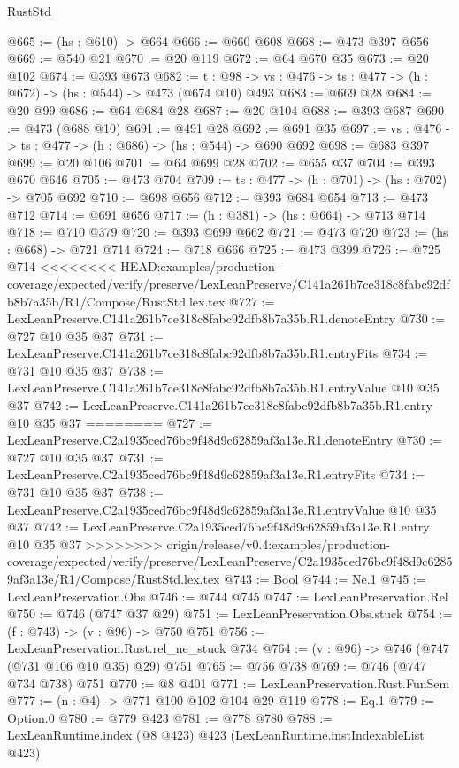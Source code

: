 \begin{lexlean}{RustStd}
\begin{coremodule}
{\begin{coremodule}
@665 := (hs : @610) -> @664
@666 := @660 @608
@668 := @473 @397 @656
@669 := @540 @21
@670 := @20 @119
@672 := @64 @670 @35
@673 := @20 @102
@674 := @393 @673
@682 := {t : @98} -> {vs : @476} -> {ts : @477} -> (h : @672) -> (hs : @544) -> @473 (@674 @10) @493
@683 := @669 @28
@684 := @20 @99
@686 := @64 @684 @28
@687 := @20 @104
@688 := @393 @687
@690 := @473 (@688 @10)
@691 := @491 @28
@692 := @691 @35
@697 := {vs : @476} -> {ts : @477} -> (h : @686) -> (hs : @544) -> @690 @692
@698 := @683 @397
@699 := @20 @106
@701 := @64 @699 @28
@702 := @655 @37
@704 := @393 @670 @646
@705 := @473 @704
@709 := {ts : @477} -> (h : @701) -> (hs : @702) -> @705 @692
@710 := @698 @656
@712 := @393 @684 @654
@713 := @473 @712
@714 := @691 @656
@717 := (h : @381) -> (hs : @664) -> @713 @714
@718 := @710 @379
@720 := @393 @699 @662
@721 := @473 @720
@723 := (hs : @668) -> @721 @714
@724 := @718 @666
@725 := @473 @399
@726 := @725 @714
<<<<<<<< HEAD:examples/production-coverage/expected/verify/preserve/LexLeanPreserve/C141a261b7ce318c8fabc92dfb8b7a35b/R1/Compose/RustStd.lex.tex
@727 := LexLeanPreserve.C141a261b7ce318c8fabc92dfb8b7a35b.R1.denoteEntry
@730 := @727 @10 @35 @37
@731 := LexLeanPreserve.C141a261b7ce318c8fabc92dfb8b7a35b.R1.entryFits
@734 := @731 @10 @35 @37
@738 := LexLeanPreserve.C141a261b7ce318c8fabc92dfb8b7a35b.R1.entryValue @10 @35 @37
@742 := LexLeanPreserve.C141a261b7ce318c8fabc92dfb8b7a35b.R1.entry @10 @35 @37
========
@727 := LexLeanPreserve.C2a1935ced76bc9f48d9c62859af3a13e.R1.denoteEntry
@730 := @727 @10 @35 @37
@731 := LexLeanPreserve.C2a1935ced76bc9f48d9c62859af3a13e.R1.entryFits
@734 := @731 @10 @35 @37
@738 := LexLeanPreserve.C2a1935ced76bc9f48d9c62859af3a13e.R1.entryValue @10 @35 @37
@742 := LexLeanPreserve.C2a1935ced76bc9f48d9c62859af3a13e.R1.entry @10 @35 @37
>>>>>>>> origin/release/v0.4:examples/production-coverage/expected/verify/preserve/LexLeanPreserve/C2a1935ced76bc9f48d9c62859af3a13e/R1/Compose/RustStd.lex.tex
@743 := Bool
@744 := Ne.{1}
@745 := LexLeanPreservation.Obs
@746 := @744 @745
@747 := LexLeanPreservation.Rel
@750 := @746 (@747 @37 @29)
@751 := LexLeanPreservation.Obs.stuck
@754 := (f : @743) -> (v : @96) -> @750 @751
@756 := LexLeanPreservation.Rust.rel_ne_stuck @734
@764 := (v : @96) -> @746 (@747 (@731 @106 @10 @35) @29) @751
@765 := @756 @738
@769 := @746 (@747 @734 @738) @751
@770 := @8 @401
@771 := LexLeanPreservation.Rust.FunSem
@777 := (n : @4) -> @771 @100 @102 @104 @29 @119
@778 := Eq.{1}
@779 := Option.{0}
@780 := @779 @423
@781 := @778 @780
@788 := LexLeanRuntime.index (@8 @423) @423 (LexLeanRuntime.instIndexableList @423)

\end{coremodule}}
\end{coremodule}
\end{lexlean}
